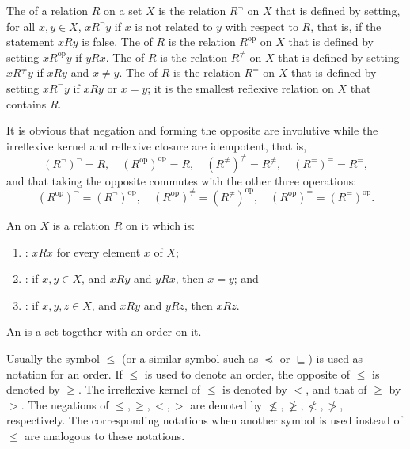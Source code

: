 \documentclass{article}
\begin{document}
The  of a relation \(R\) on a set \(X\) is the
relation \(R^\neg\) on \(X\) that is defined by setting, for all
\(x, y \in X\), \(x R^\neg y\) if \(x\) is not related to \(y\) with
respect to \(R\), that is, if the statement \(x R y\) is false.  The
 of \(R\) is the relation \(R^{\mathrm{op}}\) on
\(X\) that is defined by setting \(x R^{\mathrm{op}} y\) if \(y R x\).
The  of \(R\) is the relation \(R^\neq\)
on \(X\) that is defined by setting \(x R^\neq y\) if \(x R y\) and
\(x \neq y\).  The  of \(R\) is the
relation \(R^=\) on \(X\) that is defined by setting \(x R^= y\) if
\(x R y\) or \(x = y\); it is the smallest reflexive relation on \(X\)
that contains \(R\).

It is obvious that negation and forming the opposite are involutive
while the irreflexive kernel and reflexive closure are idempotent,
that is,
\begin{displaymath}
  (R^\neg)^\neg = R, \quad
  (R^{\mathrm{op}})^{\mathrm{op}} = R, \quad
  (R^\neq)^\neq = R^\neq, \quad
  (R^=)^= = R^=,
\end{displaymath}
and that taking the opposite commutes with the other three operations:
\begin{displaymath}
  (R^{\mathrm{op}})^\neg = (R^\neg)^{\mathrm{op}}, \quad
  (R^{\mathrm{op}})^\neq = (R^\neq)^{\mathrm{op}}, \quad
  (R^{\mathrm{op}})^= = (R^=)^{\mathrm{op}}.
\end{displaymath}

An  on \(X\) is a relation \(R\) on it which is:
\begin{enumerate}
\item {}: \(x R x\) for every element \(x\) of
  \(X\);
\item {}: if \(x, y \in X\), and \(x R y\) and
  \(y R x\), then \(x = y\); and
\item {}: if \(x, y, z \in X\), and \(x R y\) and
  \(y R z\), then \(x R z\).
\end{enumerate}
An  is a set together with an order on it.

Usually the symbol \(\leq\) (or a similar symbol such as \(\preceq\)
or \(\sqsubseteq\)) is used as notation for an order.  If \(\leq\) is
used to denote an order, the opposite of \(\leq\) is denoted by
\(\geq\).  The irreflexive kernel of \(\leq\) is denoted by \(<\), and
that of \(\geq\) by \(>\).  The negations of \(\leq, \geq, <, >\) are
denoted by \(\nleq, \ngeq, \nless, \ngtr\), respectively.  The
corresponding notations when another symbol is used instead of
\(\leq\) are analogous to these notations.
\end{document}
